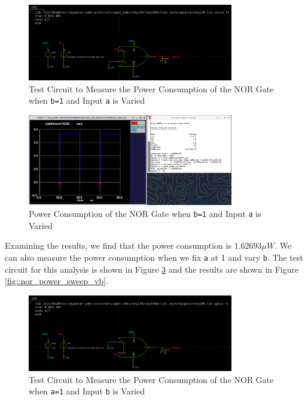 \documentclass[fleqn]{article}
\begin{document}
	\begin{figure}[H]
		\centerline{\includegraphics[width=0.8\textwidth]{nor_power_test_sweep_va.png}}
		\caption{Test Circuit to Measure the Power Consumption of the NOR Gate when \texttt{b=1} and Input \texttt{a} is Varied}
		\label{fig::nor_power_test_sweep_va}
	\end{figure}
	
	\begin{figure}[H]
		\centerline{\includegraphics[width=0.8\textwidth]{nor_power_sweep_va.png}}
		\caption{Power Consumption of the NOR Gate when \texttt{b=1} and Input \texttt{a} is Varied}
		\label{fig::nor_power_sweep_va}
	\end{figure}
	
	Examining the results, we find that the power consumption is $1.62693{\mu}W$. We can also measure the power consumption when we fix \texttt{a} at 1 and vary \texttt{b}. The test circuit for this analysis is shown in Figure \ref{fig::nor_power_test_sweep_vb} and the results are shown in Figure \ref{fig::nor_power_sweep_vb}.
	
	\begin{figure}[H]
		\centerline{\includegraphics[width=0.8\textwidth]{nor_power_test_sweep_vb.png}}
		\caption{Test Circuit to Measure the Power Consumption of the NOR Gate when \texttt{a=1} and Input \texttt{b} is Varied}
		\label{fig::nor_power_test_sweep_vb}
	\end{figure}
	
\end{document}
